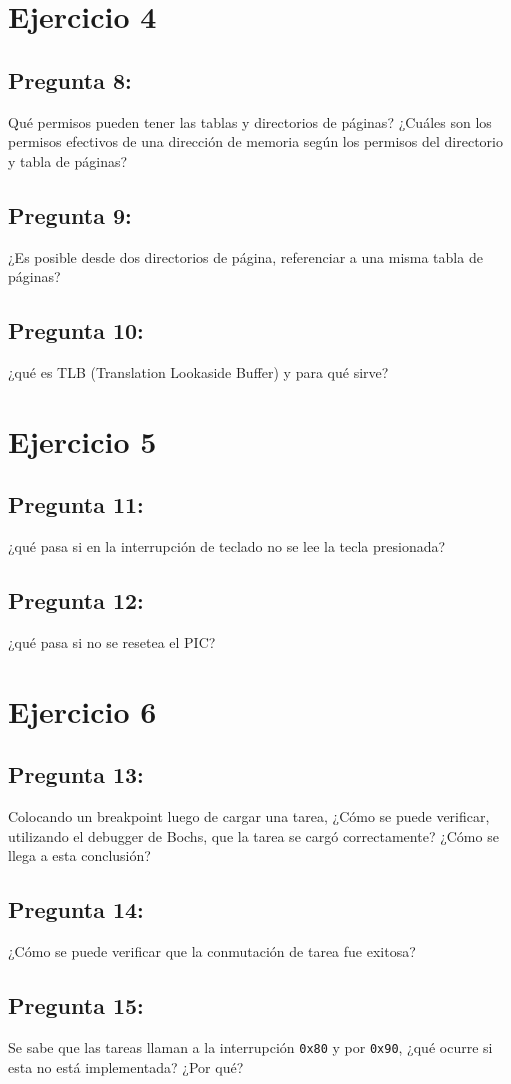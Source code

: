 \documentclass[10pt, a4paper]{article}
\begin{document}
\section{Ejercicio 4}
{\subsection{Pregunta 8:}} Qué permisos pueden tener las tablas y directorios de páginas? ¿Cuáles son los permisos efectivos de una dirección de memoria según los permisos del directorio
y tabla de páginas?

{\subsection{Pregunta 9:}} ¿Es posible desde dos directorios de página, referenciar a una misma tabla de páginas? 
{\subsection{Pregunta 10:}} ¿qué es TLB (Translation Lookaside Buffer) y para qué sirve?

\section{Ejercicio 5}
{\subsection{Pregunta 11:}} ¿qué pasa si en la interrupción de teclado no se lee la tecla presionada?
{\subsection{Pregunta 12:}} ¿qué pasa si no se resetea el PIC?
\section{Ejercicio 6}

{\subsection{Pregunta 13:}} Colocando un breakpoint luego de cargar una tarea, ¿Cómo se puede verificar, utilizando el debugger de Bochs, que la tarea se cargó correctamente?
¿Cómo se llega a esta conclusión?

{\subsection{Pregunta 14:}} ¿Cómo se puede verificar que la conmutación de tarea fue exitosa?
{\subsection{Pregunta 15:}} Se sabe que las tareas llaman a la interrupción \texttt{0x80} y por \texttt{0x90}, ¿qué ocurre si esta no está implementada? ¿Por qué?
\end{document}
